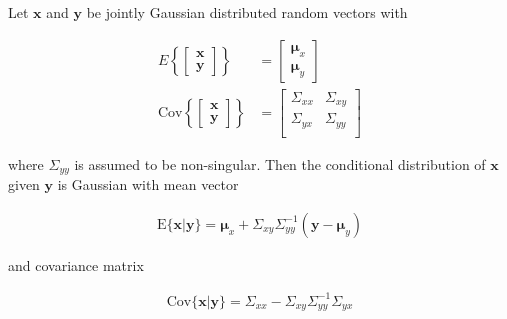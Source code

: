 \begin{lemma}

    Let $\mathbf{x}$ and $\mathbf{y}$ be jointly Gaussian distributed random
    vectors with

    \begin{align}
        E\left\{\left[\begin{array}{c}
                          \mathbf{x}\\
                          \mathbf{y}
                      \end{array}\right]\right\}&=\left[\begin{array}{c}
                                                           \boldsymbol{\mu}_x\\
                                                           \boldsymbol{\mu}_y
                                                       \end{array}\right]\label{eq:conditionaMean}\\
        \text{Cov}\left\{\left[\begin{array}{c}
                                   \mathbf{x}\\
                                   \mathbf{y}
                               \end{array}\right]\right\}&=\left[\begin{array}{cc}
                                                                     \Sigma_{xx} & \Sigma_{xy} \\
                                                                     \Sigma_{yx} & \Sigma_{yy} \\
                                                                  \end{array}\right]\label{eq:conditionalCov}
    \end{align}

    \noindent where $\Sigma_{yy}$ is assumed to be non-singular.
    Then the conditional distribution of $\mathbf{x}$ given $\mathbf{y}$ is
    Gaussian with mean vector

    \begin{align*}
        \text{E}\{\mathbf{x}|\mathbf{y}\}=\boldsymbol{\mu}_x+\Sigma_{xy}\Sigma_{yy}^{-1}(\mathbf{y}-\boldsymbol{\mu}_y)
    \end{align*}

    \noindent and covariance matrix

    \begin{align*}
        \text{Cov}\{\mathbf{x}|\mathbf{y}\}=\Sigma_{xx}-\Sigma_{xy}\Sigma_{yy}^{-1}\Sigma_{yx}
    \end{align*}

    \label{lemma:conditionalGaussians}

\end{lemma}

